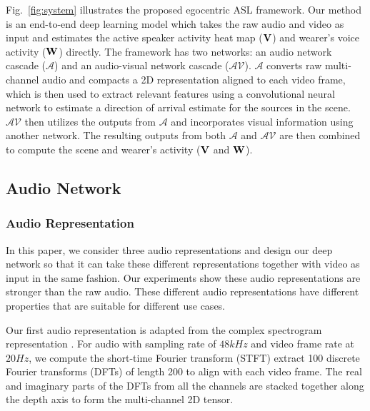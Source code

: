 \documentclass[10pt,twocolumn,letterpaper]{article}
\newcommand{\AN}{$\mathcal{A}$}
\newcommand{\AVN}{$\mathcal{AV}$}
\begin{document}
Fig.~\ref{fig:system} illustrates the proposed egocentric ASL framework. 
Our method is an end-to-end deep learning model which takes the raw audio and video as input and estimates the 
active speaker activity heat map ($\bf{V}$) and wearer's voice activity ($\bf{W}$) directly. 
The framework has two networks: an audio network cascade (\AN) and an audio-visual network cascade (\AVN). 
\AN $ $ converts raw multi-channel audio and compacts a 2D representation aligned to each video frame, 
which is then used to extract relevant features using a convolutional neural network to estimate a direction of arrival estimate for the sources in the scene. 
\AVN $ $ then utilizes the outputs from \AN $ $ and incorporates visual information using another network. The resulting outputs from both \AN $ $ and \AVN $ $ are then combined to compute the scene and wearer's activity ($\bf{V}$ and $\bf{W}$). 




\subsection{Audio Network} \label{sec:audio-only}


\vspace{-5pt}
\subsubsection{Audio Representation}
\vspace{-5pt}
In this paper, we consider three audio representations and design our deep network so that
it can take these different representations together with video as input in the same fashion.
Our experiments show these audio representations are stronger than the raw audio. These different audio representations
have different properties that are suitable for different use cases.

Our first audio representation is adapted from the complex spectrogram representation \cite{wangaaai}.
For audio with sampling rate of $48kHz$ and video frame rate at $20Hz$, we compute the short-time Fourier
transform (STFT) extract 
100 discrete Fourier transforms (DFTs) of length 200 to align with each video frame. 
The real and imaginary parts of the DFTs from all the channels are stacked together
along the depth axis
to form the multi-channel 2D tensor. 
\end{document}
